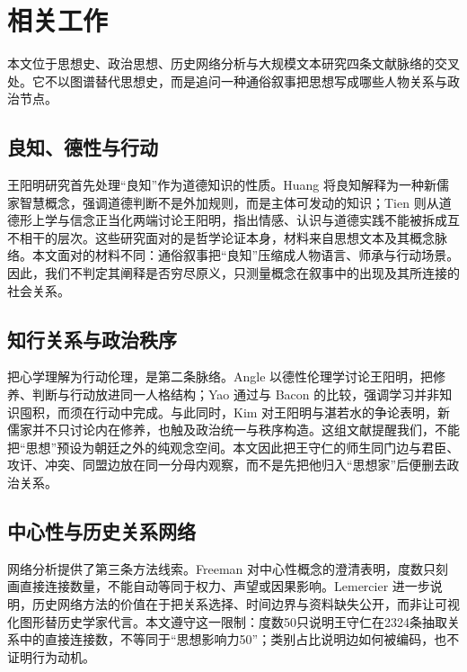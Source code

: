 \section{相关工作}

本文位于思想史、政治思想、历史网络分析与大规模文本研究四条文献脉络的交叉处。它不以图谱替代思想史，而是追问一种通俗叙事把思想写成哪些人物关系与政治节点。

\subsection{良知、德性与行动}

王阳明研究首先处理“良知”作为道德知识的性质。Huang 将良知解释为一种新儒家智慧概念，强调道德判断不是外加规则，而是主体可发动的知识\cite{huang2006}；Tien 则从道德形上学与信念正当化两端讨论王阳明，指出情感、认识与道德实践不能被拆成互不相干的层次\cite{tien2004,tien2010}。这些研究面对的是哲学论证本身，材料来自思想文本及其概念脉络。本文面对的材料不同：通俗叙事把“良知”压缩成人物语言、师承与行动场景。因此，我们不判定其阐释是否穷尽原义，只测量概念在叙事中的出现及其所连接的社会关系。

\subsection{知行关系与政治秩序}

把心学理解为行动伦理，是第二条脉络。Angle 以德性伦理学讨论王阳明，把修养、判断与行动放进同一人格结构\cite{angle2010}；Yao 通过与 Bacon 的比较，强调学习并非知识囤积，而须在行动中完成\cite{yao2013}。与此同时，Kim 对王阳明与湛若水的争论表明，新儒家并不只讨论内在修养，也触及政治统一与秩序构造\cite{kim2012}。这组文献提醒我们，不能把“思想”预设为朝廷之外的纯观念空间。本文因此把王守仁的师生同门边与君臣、攻讦、冲突、同盟边放在同一分母内观察，而不是先把他归入“思想家”后便删去政治关系。

\subsection{中心性与历史关系网络}

网络分析提供了第三条方法线索。Freeman 对中心性概念的澄清表明，度数只刻画直接连接数量，不能自动等同于权力、声望或因果影响\cite{freeman1978}。Lemercier 进一步说明，历史网络方法的价值在于把关系选择、时间边界与资料缺失公开，而非让可视化图形替历史学家代言\cite{lemercier2015}。本文遵守这一限制：度数50只说明王守仁在2324条抽取关系中的直接连接数，不等同于“思想影响力50”；类别占比说明边如何被编码，也不证明行为动机。

